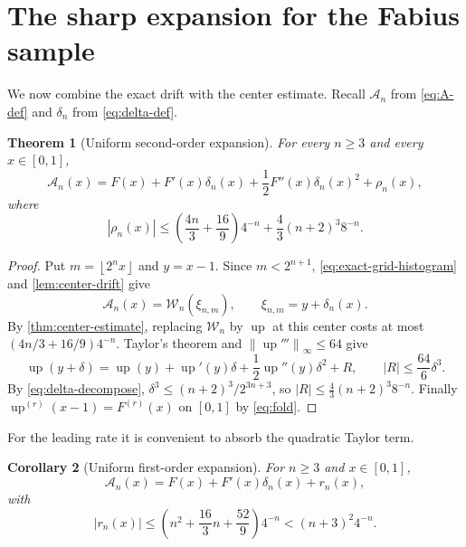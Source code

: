 \documentclass[11pt,oneside]{article}
\newtheorem{theorem}{Theorem}[section]
\newtheorem{corollary}[theorem]{Corollary}
\theoremstyle{definition}
\theoremstyle{remark}
\newcommand{\Up}{\operatorname{up}}
\newcommand{\norm}[1]{\left\lVert #1\right\rVert}
\newcommand{\abs}[1]{\left\lvert #1\right\rvert}
\newcommand{\floor}[1]{\left\lfloor #1\right\rfloor}
\begin{document}
\section{The sharp expansion for the Fabius sample}
\label{sec:main-rate}

We now combine the exact drift with the center estimate.  Recall
$\mathcal A_n$ from \eqref{eq:A-def} and $\delta_n$ from \eqref{eq:delta-def}.

\begin{theorem}[Uniform second-order expansion]
\label{thm:second-order-expansion}
For every $n\ge3$ and every $x\in[0,1]$,
\begin{equation}
 \boxed{\displaystyle
 \mathcal A_n(x)
 =F(x)+F'(x)\delta_n(x)
 +\frac12F''(x)\delta_n(x)^2+\rho_n(x),}                   \label{eq:second-order-expansion}
\end{equation}
where
\begin{equation}
 \abs{\rho_n(x)}\le
 \left(\frac{4n}{3}+\frac{16}{9}\right)4^{-n}
 +\frac43(n+2)^3 8^{-n}.                                  \label{eq:second-order-remainder}
\end{equation}
\end{theorem}

\begin{proof}
Put $m=\floor{2^n x}$ and $y=x-1$.  Since $m<2^{n+1}$,
\eqref{eq:exact-grid-histogram} and \cref{lem:center-drift} give
\begin{equation*}
 \mathcal A_n(x)=\mathcal W_n(\xi_{n,m}),
 \qquad
 \xi_{n,m}=y+\delta_n(x).
\end{equation*}
By \cref{thm:center-estimate}, replacing $\mathcal W_n$ by $\Up$ at this center
costs at most $(4n/3+16/9)4^{-n}$.  Taylor's theorem and
$\norm{\Up'''}_\infty\le64$ give
\begin{equation*}
 \Up(y+\delta)=\Up(y)+\Up'(y)\delta+\frac12\Up''(y)\delta^2+R,
 \qquad \abs R\le\frac{64}{6}\delta^3.
\end{equation*}
By \eqref{eq:delta-decompose},
$\delta^3\le(n+2)^3/2^{3n+3}$, so
$\abs R\le\frac43(n+2)^3 8^{-n}$.  Finally
$\Up^{(r)}(x-1)=F^{(r)}(x)$ on $[0,1]$ by \eqref{eq:fold}.
\end{proof}

For the leading rate it is convenient to absorb the quadratic Taylor term.

\begin{corollary}[Uniform first-order expansion]
\label{cor:first-order-expansion}
For $n\ge3$ and $x\in[0,1]$,
\begin{equation}
 \mathcal A_n(x)=F(x)+F'(x)\delta_n(x)+r_n(x),              \label{eq:first-order-expansion}
\end{equation}
with
\begin{equation}
 \abs{r_n(x)}\le
 \left(n^2+\frac{16}{3}n+\frac{52}{9}\right)4^{-n}
 <(n+3)^2 4^{-n}.                                         \label{eq:first-order-remainder}
\end{equation}
\end{corollary}
\end{document}
